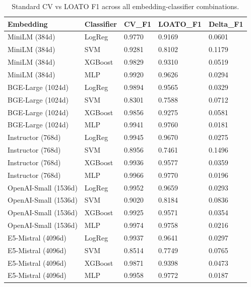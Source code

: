 \begin{table}[htbp]
\centering
\caption{Standard CV vs LOATO F1 across all embedding-classifier combinations.}
\label{tab:master-results}
\begin{tabular}{lllll}
\toprule
Embedding & Classifier & CV\_F1 & LOATO\_F1 & Delta\_F1 \\
\midrule
MiniLM (384d) & LogReg & 0.9770 & 0.9169 & 0.0601 \\
MiniLM (384d) & SVM & 0.9281 & 0.8102 & 0.1179 \\
MiniLM (384d) & XGBoost & 0.9829 & 0.9310 & 0.0519 \\
MiniLM (384d) & MLP & 0.9920 & 0.9626 & 0.0294 \\
BGE-Large (1024d) & LogReg & 0.9894 & 0.9565 & 0.0329 \\
BGE-Large (1024d) & SVM & 0.8301 & 0.7588 & 0.0712 \\
BGE-Large (1024d) & XGBoost & 0.9856 & 0.9275 & 0.0581 \\
BGE-Large (1024d) & MLP & 0.9941 & 0.9760 & 0.0181 \\
Instructor (768d) & LogReg & 0.9945 & 0.9670 & 0.0275 \\
Instructor (768d) & SVM & 0.8956 & 0.7461 & 0.1496 \\
Instructor (768d) & XGBoost & 0.9936 & 0.9577 & 0.0359 \\
Instructor (768d) & MLP & 0.9966 & 0.9770 & 0.0196 \\
OpenAI-Small (1536d) & LogReg & 0.9952 & 0.9659 & 0.0293 \\
OpenAI-Small (1536d) & SVM & 0.9020 & 0.8184 & 0.0836 \\
OpenAI-Small (1536d) & XGBoost & 0.9925 & 0.9571 & 0.0354 \\
OpenAI-Small (1536d) & MLP & 0.9974 & 0.9758 & 0.0216 \\
E5-Mistral (4096d) & LogReg & 0.9937 & 0.9641 & 0.0297 \\
E5-Mistral (4096d) & SVM & 0.8514 & 0.7749 & 0.0765 \\
E5-Mistral (4096d) & XGBoost & 0.9871 & 0.9398 & 0.0473 \\
E5-Mistral (4096d) & MLP & 0.9958 & 0.9772 & 0.0187 \\
\bottomrule
\end{tabular}

\end{table}
